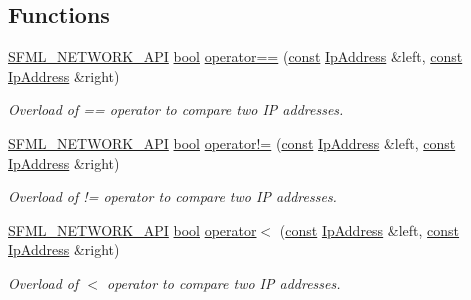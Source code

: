 \subsection*{Functions}
\begin{DoxyCompactItemize}
\item 
\hyperlink{sfml_2dep_2_s_f_m_l-2_84_82_2include_2_s_f_m_l_2_network_2_export_8hpp_ac5d46d4ffd98e947e28c54d051b338e7}{S\-F\-M\-L\-\_\-\-N\-E\-T\-W\-O\-R\-K\-\_\-\-A\-P\-I} \hyperlink{term__entry_8h_a002004ba5d663f149f6c38064926abac}{bool} \hyperlink{namespacesf_ac911326160206c1038ceff6face28b89}{operator==} (\hyperlink{term__entry_8h_a57bd63ce7f9a353488880e3de6692d5a}{const} \hyperlink{classsf_1_1_ip_address}{Ip\-Address} \&left, \hyperlink{term__entry_8h_a57bd63ce7f9a353488880e3de6692d5a}{const} \hyperlink{classsf_1_1_ip_address}{Ip\-Address} \&right)
\begin{DoxyCompactList}\small\item\em Overload of == operator to compare two I\-P addresses. \end{DoxyCompactList}\item 
\hyperlink{sfml_2dep_2_s_f_m_l-2_84_82_2include_2_s_f_m_l_2_network_2_export_8hpp_ac5d46d4ffd98e947e28c54d051b338e7}{S\-F\-M\-L\-\_\-\-N\-E\-T\-W\-O\-R\-K\-\_\-\-A\-P\-I} \hyperlink{term__entry_8h_a002004ba5d663f149f6c38064926abac}{bool} \hyperlink{namespacesf_ad68fc42c15ea415b59023a4a277f8946}{operator!=} (\hyperlink{term__entry_8h_a57bd63ce7f9a353488880e3de6692d5a}{const} \hyperlink{classsf_1_1_ip_address}{Ip\-Address} \&left, \hyperlink{term__entry_8h_a57bd63ce7f9a353488880e3de6692d5a}{const} \hyperlink{classsf_1_1_ip_address}{Ip\-Address} \&right)
\begin{DoxyCompactList}\small\item\em Overload of != operator to compare two I\-P addresses. \end{DoxyCompactList}\item 
\hyperlink{sfml_2dep_2_s_f_m_l-2_84_82_2include_2_s_f_m_l_2_network_2_export_8hpp_ac5d46d4ffd98e947e28c54d051b338e7}{S\-F\-M\-L\-\_\-\-N\-E\-T\-W\-O\-R\-K\-\_\-\-A\-P\-I} \hyperlink{term__entry_8h_a002004ba5d663f149f6c38064926abac}{bool} \hyperlink{namespacesf_a62e90a478e790defc429ecd94ad67ab3}{operator$<$} (\hyperlink{term__entry_8h_a57bd63ce7f9a353488880e3de6692d5a}{const} \hyperlink{classsf_1_1_ip_address}{Ip\-Address} \&left, \hyperlink{term__entry_8h_a57bd63ce7f9a353488880e3de6692d5a}{const} \hyperlink{classsf_1_1_ip_address}{Ip\-Address} \&right)
\begin{DoxyCompactList}\small\item\em Overload of $<$ operator to compare two I\-P addresses. \end{DoxyCompactList}\item 

\end{DoxyCompactItemize}
